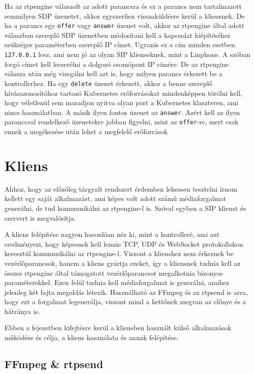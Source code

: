 Ha az rtpengine válaszolt az adott parancsra és ez a parancs nem tartalmazott semmilyen 
SDP üzenetet, akkor egyszerűen visszaküldésre kerül a kliensnek. De ha a parancs egy 
\texttt{offer} vagy \texttt{answer} üzenet volt, akkor az rtpengine által adott válaszban 
szereplő SDP üzenetben módosítani kell a kapcsolat kiépítéséhez szükséges paraméterben 
szereplő IP címet. Ugyanis ez a cím minden esetben \texttt{127.0.0.1} lesz, ami nem jó az 
olyan SIP klienseknek, mint a Linphone. A szóban forgó címet kell lecserélni a dolgozó 
csomópont IP címére. De az rtpengine válasza után még vizsgálni kell azt is, hogy milyen 
parancs érkezett be a kontrollerhez. Ha egy \texttt{delete} üzenet érkezett, akkor a 
benne szereplő hívásazonosítóhoz tartozó Kubernetes erőforrásokat mindenképpen törölni 
kell, hogy véletlenül sem maradjon nyitva olyan port a Kubernetes klaszteren, ami nincs 
használatban. A másik ilyen fontos üzenet az \texttt{answer}. Azért kell az ilyen 
paranccsal rendelkező üzenetekre jobban figyelni, mint az \texttt{offer}-re, mert csak 
ennek a megékezése után lehet a megfelelő erőforrások

\section{Kliens}

Ahhoz, hogy az előzőleg tárgyalt rendszert érdemben lehessen tesztelni írnom kellett egy 
saját alkalmazást, ami képes volt adott számú médiaforgalmat generálni, de tud 
kommunikálni az rtpengine-l is. Szóval egyben a SIP klienst és szervert is megvalósítja.

A kliens felépítése nagyon hasonlóan néz ki, mint a kontrolleré, ami azt eredményezi, 
hogy képesnek kell lennie  TCP, UDP és WebSocket protokollokon keresztül kommunikálni az 
rtpengine-l. Viszont a klienshez nem érkeznek be vezérlőparancsok, hanem a kliens gyártja 
ezeket, így a kliensnek tudnia kell az összes rtpengine által támogatott vezérlőparancsot 
megalkotnia bizonyos paraméterekkel. Ezen felül tudnia kell médiaforgalmat is generálni, 
amihez jelenleg két fajta megoldás létezik. Használható az FFmpeg és az rtpsend is arra, 
hogy ezt a forgalmat legenerálja, viszont mind a kettőnek megvan az előnye és a hátránya 
is. 

Ebben a fejezetben kifejtésre kerül a kliensben használt külső alkalmazások működése és 
célja, a kliens használata és annak felépítése. 

\subsection{FFmpeg \& rtpsend}

